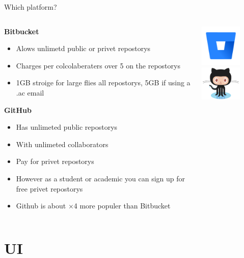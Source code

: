 \documentclass[10pt]{beamer}
\begin{document}
\begin{frame}[fragile]{Which platform?}
  \begin{columns}[T]
    \begin{column}{.8\textwidth}
	\textbf{Bitbucket}
	\begin{itemize}
		\item Alows unlimetd public or privet repostorys
		\item Charges per colcolaberaters over 5 on the repostorys 
		\item 1GB stroige for large flies all repostorys, 5GB if using a .ac email
	\end{itemize}
	\textbf{GitHub}
	\begin{itemize}
		\item Has unlimeted public repostorys 
		\item With unlimeted collaborators
		\item Pay for privet repostorys
		\item However as a student or academic you can sign up for free privet repostorys
		\item Github is about $\times$4 more populer than Bitbucket
	\end{itemize}
    \end{column}
    \begin{column}{.2\textwidth}
	\includegraphics[width=2cm]{Figs/git/Bitbucket} \newline  \newline   \newline \newline 
	\includegraphics[width=2cm]{Figs/git/Octocat}
    \end{column}
  \end{columns}
\end{frame}



\section{UI}
\end{document}
